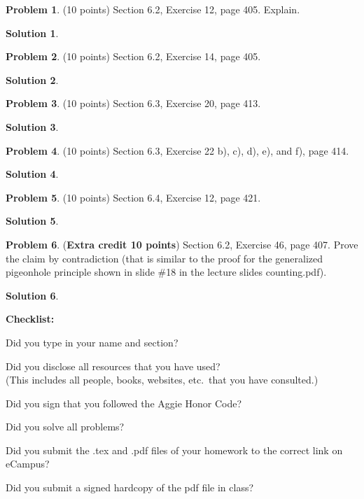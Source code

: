 \documentclass{article}
\theoremstyle{definition}
\newtheorem{problem}{Problem}
\newtheorem*{solution}{Solution}
\newcommand{\checklist}{\noindent\textbf{Checklist:}
\begin{compactitem}[$\Box$] 
\item Did you type in your name and section? 
\item Did you disclose all resources that you have used? \\
(This includes all people, books, websites, etc.\ that you have consulted.)
\item Did you sign that you followed the Aggie Honor Code? 
\item Did you solve all problems? 
\item Did you submit the .tex and .pdf files of your homework to the correct link on eCampus?
\item Did you submit a signed hardcopy of the pdf file in class? 
\end{compactitem}
}
\begin{document}
\begin{problem} (10 points) 
Section 6.2, Exercise 12, page 405.  Explain.
\end{problem}
\begin{solution} 
\end{solution}

\begin{problem} (10 points) 
Section 6.2, Exercise 14, page 405.
\end{problem}
\begin{solution} 
\end{solution}

\begin{problem} (10 points) 
Section 6.3, Exercise 20, page 413.
\end{problem}
\begin{solution} 
\end{solution}

\begin{problem} (10 points) 
Section 6.3, Exercise 22 b), c), d), e), and f), page 414.
\end{problem}
\begin{solution} 
\end{solution}

\begin{problem} (10 points) 
Section 6.4, Exercise 12, page 421.
\end{problem}
\begin{solution} 
\end{solution}

\begin{problem} (\textbf{Extra credit 10 points})
Section 6.2, Exercise 46, page 407.  Prove the claim by contradiction 
(that is similar to the proof for the generalized pigeonhole principle shown 
in slide \#18 in the lecture slides counting.pdf).
\end{problem}
\begin{solution} 
\end{solution}

\goodbreak
\checklist
\end{document}
